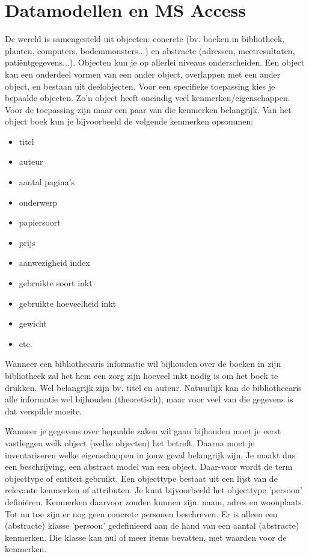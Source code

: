 \section{Datamodellen en MS Access}
De wereld is samengesteld uit objecten: concrete (bv. boeken in bibliotheek, planten, computers, bodemmonsters...) en abstracte (adressen, meetresultaten, patiëntgegevens...). Objecten kun je op allerlei niveaus onderscheiden. Een object kan een onderdeel vormen van een ander object, overlappen met een ander object, en bestaan uit deelobjecten. Voor een specifieke toepassing kies je bepaalde objecten. Zo'n object heeft oneindig veel kenmerken/eigenschappen. Voor de toepassing zijn maar een paar van die kenmerken belangrijk.
 Van het object boek kun je bijvoorbeeld de volgende kenmerken opsommen:
\begin{itemize}
    \item	titel
    \item	auteur
    \item	aantal pagina's
    \item	onderwerp
    \item	papiersoort
    \item	prijs
    \item	aanwezigheid index
    \item	gebruikte soort inkt
    \item	gebruikte hoeveelheid inkt
    \item	gewicht
    \item   etc.
\end{itemize}


Wanneer een bibliothecaris informatie wil bijhouden over de boeken in zijn bibliotheek zal het hem een zorg zijn hoeveel inkt nodig is om het boek te drukken. Wel belangrijk zijn bv. titel en auteur. Natuurlijk kan de bibliothecaris alle informatie wel bijhouden (theoretisch), maar voor veel van die gegevens is dat verspilde moeite.

Wanneer je gegevens over bepaalde zaken wil gaan bijhouden moet je eerst vastleggen welk object (welke objecten) het betreft. Daarna moet je inventariseren welke eigenschappen in jouw geval belangrijk zijn. Je maakt dus een beschrijving, een abstract model van een object. Daar-voor wordt de term objecttype of entiteit gebruikt. Een objecttype bestaat uit een lijst van de relevante kenmerken of attributen. Je kunt bijvoorbeeld het objecttype 'persoon' definiëren. Kenmerken daarvoor zouden kunnen zijn: naam, adres en woonplaats. Tot nu toe zijn er nog geen concrete personen beschreven. Er is alleen een (abstracte) klasse 'persoon' gedefinieerd aan de hand van een aantal (abstracte) kenmerken. Die klasse kan nul of meer items bevatten, met waarden voor de kenmerken.

